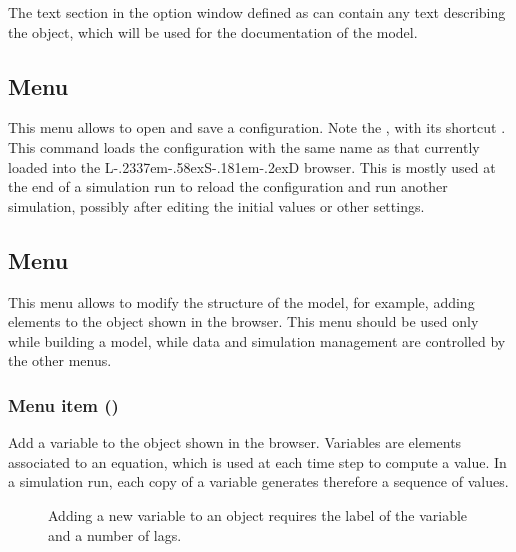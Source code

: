 \documentclass [11pt,a4paper] {book}
\def\LsD{{L\kern-.2337em\lower-.58ex\hbox{S}\kern-.181em\lower-.2ex\hbox{D}}\xspace}
\begin{document}
The text section in the option window defined as  can contain any text describing the object, which will be used for the documentation of the model.



\subsection{Menu }
This menu allows to open and save a configuration. Note the , with its shortcut . This command loads the configuration with the same name as that currently loaded into the \LsD browser. This is mostly used at the end of a simulation run to reload the configuration and run another simulation, possibly after editing the initial values or other settings.



\subsection{Menu }

This menu allows to modify the structure of the model, for example, adding elements to the object shown in the browser. This menu should be used only while building a model, while data and simulation management are controlled by the other menus.

\subsubsection{Menu item  ()}

Add a variable to the object shown in the browser. Variables are elements associated to an equation, which is used at each time step to compute a value. In a simulation run, each copy of a variable generates therefore a sequence of values.

\begin{figure}[ht]
  \centering
  \caption{Adding a new variable to an object requires the label of the variable and a number of lags.}
  \label{fig:new_var}
\end{figure}
\end{document}
